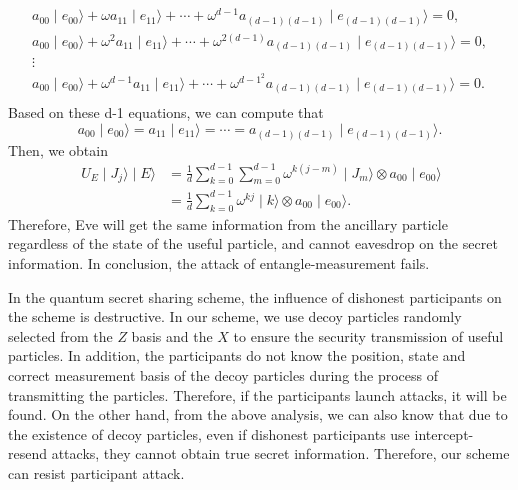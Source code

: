 \documentclass[pdflatex,sn-mathphys]{sn-jnl}%
\theoremstyle{thmstyleone}%
\theoremstyle{thmstyletwo}%
\theoremstyle{thmstylethree}%
\begin{document}
\begin{gather*}
    a_{00}\mid e_{00}\rangle+\omega a_{11}\mid e_{11}\rangle+\cdots+\omega^{d-1} a_{(d-1)(d-1)}\mid e_{(d-1)(d-1)}\rangle=0, \\
    a_{00}\mid e_{00}\rangle+\omega^2 a_{11}\mid e_{11}\rangle+\cdots+\omega^{2(d-1)} a_{(d-1)(d-1)}\mid e_{(d-1)(d-1)}\rangle=0, \\
    \vdots \\
    a_{00}\mid e_{00}\rangle+\omega^{d-1} a_{11}\mid e_{11}\rangle+\cdots+\omega^{{d-1}^2} a_{(d-1)(d-1)}\mid e_{(d-1)(d-1)}\rangle=0. \\
\end{gather*}
Based on these d-1 equations, we can compute that 
\begin{equation*}
a_{00}\mid e_{00}\rangle=a_{11}\mid e_{11}\rangle=\cdots=a_{(d-1)(d-1)}\mid e_{(d-1)(d-1)}\rangle.
\end{equation*}
Then, we obtain
\begin{equation*}  \begin{split}
\ U_E\mid J_j\rangle\mid E\rangle &=\frac{1}{d}\sum_{k=0}^{d-1}\sum_{m=0}^{d-1}\omega^{k(j-m)}\mid J_m\rangle\otimes a_{00}\mid e_{00}\rangle \\
 &=\frac{1}{d}\sum_{k=0}^{d-1}\omega^{kj}\mid k\rangle\otimes a_{00}\mid e_{00}\rangle.
\end{split}   \end{equation*}
\indent Therefore, Eve will get the same information from the ancillary particle regardless of the state of the useful particle, and cannot eavesdrop on the secret information. In conclusion, the attack of entangle-measurement fails.

  In the quantum secret sharing scheme, the influence of dishonest participants on the scheme is destructive. In our scheme, we use decoy particles randomly selected from the $Z$ basis and the $X$ to ensure the security transmission of useful particles. In addition, the participants do not know the position, state and correct measurement basis of the decoy particles during the process of transmitting the particles. Therefore, if the participants launch attacks, it will be found. On the other hand, from the above analysis, we can also know that due to the existence of decoy particles, even if dishonest participants use intercept-resend attacks, they cannot obtain true secret information. Therefore, our scheme can resist participant attack.
\end{document}
